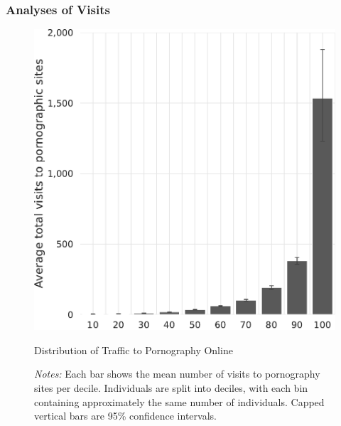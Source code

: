 \documentclass[12pt,twoside]{article}
\begin{document}
\subsubsection{Analyses of Visits}
\label{si:visits}
\begin{figure}[ht]
	\centering
	\includegraphics[width=.65\linewidth]{figs/distribution_visits_to_adultsites.pdf}
	\caption{Distribution of Traffic to Pornography Online}
	\caption*{\footnotesize \emph{Notes:} 
            Each bar shows the mean number of visits to pornography sites per decile.
		Individuals are split into deciles, with each bin containing approximately the same number of individuals.
		Capped vertical bars are 95\% confidence intervals.
	}
	\label{fig:distribution_visits}
\end{figure}
\end{document}
